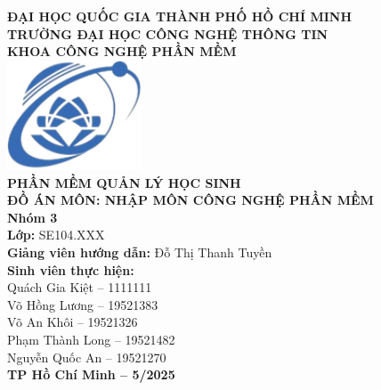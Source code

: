 \documentclass[a4paper]{article}
\begin{document}
\fontsize{13pt}{15.6pt}\selectfont

\begin{center}
    \textbf{\Large ĐẠI HỌC QUỐC GIA THÀNH PHỐ HỒ CHÍ MINH} \\[6pt]
    \textbf{\Large TRƯỜNG ĐẠI HỌC CÔNG NGHỆ THÔNG TIN} \\[6pt]
    \textbf{\Large KHOA CÔNG NGHỆ PHẦN MỀM} \\[40pt]

    \includegraphics[width=0.3\textwidth]{uit-logo} %
    \\[1cm]

    {\LARGE \textbf{PHẦN MỀM QUẢN LÝ HỌC SINH}} \\[30pt]

    \textbf{\large ĐỒ ÁN MÔN: NHẬP MÔN CÔNG NGHỆ PHẦN MỀM} \\[10pt]
    
    \textbf{\Large Nhóm 3} \\[10pt]
        
    \textbf{Lớp:} SE104.XXX  \\[10pt]
    
    \textbf{Giảng viên hướng dẫn:} Đỗ Thị Thanh Tuyền \\[10pt]
    
    \textbf{Sinh viên thực hiện:} \\
    Quách Gia Kiệt – 1111111 \\
    Võ Hồng Lương – 19521383 \\
    Võ An Khôi – 19521326 \\
    Phạm Thành Long – 19521482 \\
    Nguyễn Quốc An – 19521270 \\[100pt]

    \textbf{TP Hồ Chí Minh – 5/2025}
\end{center}

\newpage

\setcounter{page}{2}
\end{document}
